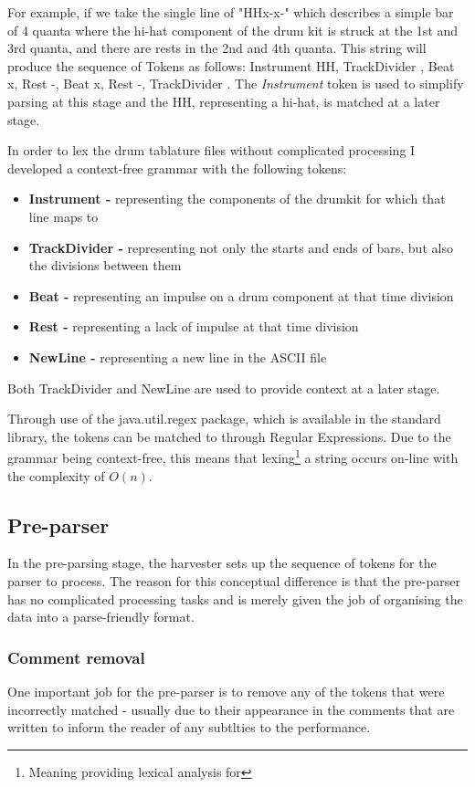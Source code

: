 \documentclass[12pt,twoside,notitlepage]{report}
\begin{document}
		For example, if we take the single line of "HH\textpipe x-x-\textpipe" which describes a simple bar of 4 quanta where the hi-hat component of the drum kit is struck at the 1st and 3rd quanta, and there are rests in the 2nd and 4th quanta. This string will produce the sequence of Tokens as follows: Instrument HH, TrackDivider \textpipe, Beat x, Rest -, Beat x, Rest -, TrackDivider \textpipe. The \emph{Instrument} token is used to simplify parsing at this stage and the HH, representing a hi-hat, is matched at a later stage.
		
		In order to lex the drum tablature files without complicated processing I developed a context-free grammar with the following tokens:
		\begin{itemize}
			\item{\textbf{Instrument -} representing the components of the drumkit for which that line maps to}
			\item{\textbf{TrackDivider -} representing not only the starts and ends of bars, but also the divisions between them}
			\item{\textbf{Beat -} representing an impulse on a drum component at that time division}
			\item{\textbf{Rest -} representing a lack of impulse at that time division}
			\item{\textbf{NewLine -} representing a new line in the ASCII file}
		\end{itemize}
		Both TrackDivider and NewLine are used to provide context at a later stage.
		
		Through use of the java.util.regex package, which is available in the standard library, the tokens can be matched to through Regular Expressions. Due to the grammar being context-free, this means that lexing\footnote{Meaning providing lexical analysis for} a string occurs on-line with the complexity of $O(n)$.

		\subsection{Pre-parser}
			In the pre-parsing stage, the harvester sets up the sequence of tokens for the parser to process. The reason for this conceptual difference is that the pre-parser has no complicated processing tasks and is merely given the job of organising the data into a parse-friendly format. 
			
			\subsubsection{Comment removal}
			One important job for the pre-parser is to remove any of the tokens that were incorrectly matched - usually due to their appearance in the comments that are written to inform the reader of any subtlties to the performance. 
			
\end{document}
